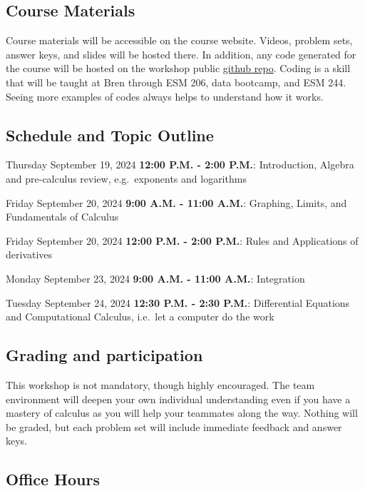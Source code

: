 \documentclass[
  letterpaper,
  DIV=11,
  numbers=noendperiod]{scrartcl}
\begin{document}
\subsection{Course Materials}\label{course-materials}

Course materials will be accessible on the course website. Videos,
problem sets, answer keys, and slides will be hosted there. In addition,
any code generated for the course will be hosted on the workshop public
\href{https://github.com/nggrimes/bren-math-workshop}{github repo}.
Coding is a skill that will be taught at Bren through ESM 206, data
bootcamp, and ESM 244. Seeing more examples of codes always helps to
understand how it works.

\subsection{Schedule and Topic
Outline}\label{schedule-and-topic-outline}

Thursday September 19, 2024 \textbf{12:00 P.M. - 2:00 P.M.}:
Introduction, Algebra and pre-calculus review, e.g.~exponents and
logarithms

Friday September 20, 2024 \textbf{9:00 A.M. - 11:00 A.M.}: Graphing,
Limits, and Fundamentals of Calculus

Friday September 20, 2024 \textbf{12:00 P.M. - 2:00 P.M.}: Rules and
Applications of derivatives

Monday September 23, 2024 \textbf{9:00 A.M. - 11:00 A.M.}: Integration

Tuesday September 24, 2024 \textbf{12:30 P.M. - 2:30 P.M.}: Differential
Equations and Computational Calculus, i.e.~let a computer do the work

\subsection{Grading and participation}\label{grading-and-participation}

This workshop is not mandatory, though highly encouraged. The team
environment will deepen your own individual understanding even if you
have a mastery of calculus as you will help your teammates along the
way. Nothing will be graded, but each problem set will include immediate
feedback and answer keys.

\subsection{Office Hours}\label{office-hours}
\end{document}
